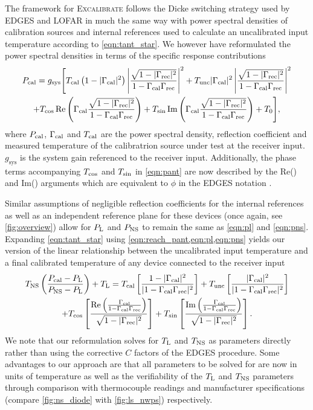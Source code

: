 The framework for \textsc{Excalibrate} follows the Dicke switching strategy used by EDGES \citep{edgesCal} and LOFAR \citep{lofarCal} in much the same way with power spectral densities of calibration sources and internal references used to calculate an uncalibrated input temperature according to \cref{eqn:tant_star}. We however have reformulated the power spectral densities in terms of the specific response contributions
\begin{multline}
    \label{eqn:reach_pant}
    P_{\mathrm{cal}} = g_{\mathrm{sys}} \Bigg[ T_{\mathrm{cal}}\left(1-|\Gamma_{\mathrm{cal}}|^2\right)\left|\frac{\sqrt{1 - |\Gamma_{\mathrm{rec}}|^2}}{1-\Gamma_{\mathrm{cal}}\Gamma_{\mathrm{rec}}}\right|^2 + T_{\mathrm{unc}}|\Gamma_{\mathrm{cal}}|^2\left|\frac{\sqrt{1 - |\Gamma_{\mathrm{rec}}|^2}}{1-\Gamma_{\mathrm{cal}}\Gamma_{\mathrm{rec}}}\right|^2 \\
    + T_{\mathrm{cos}}\operatorname{Re}\left(\Gamma_{\mathrm{cal}}\frac{\sqrt{1 - |\Gamma_{\mathrm{rec}}|^2}}{1-\Gamma_{\mathrm{cal}}\Gamma_{\mathrm{rec}}}\right) + T_{\mathrm{sin}}\operatorname{Im}\left(\Gamma_{\mathrm{cal}}\frac{\sqrt{1 - |\Gamma_{\mathrm{rec}}|^2}}{1-\Gamma_{\mathrm{cal}}\Gamma_{\mathrm{rec}}}\right) + T_0 \Bigg],
\end{multline}
where $P_{\mathrm{cal}}$, $\Gamma_{\mathrm{cal}}$ and $T_{\mathrm{cal}}$ are the power spectral density, reflection coefficient and measured temperature of the calibratrion source under test at the receiver input. $g_{\mathrm{sys}}$ is the system gain referenced to the receiver input. Additionally, the phase terms accompanying $T_{\mathrm{cos}}$ and $T_{\mathrm{sin}}$ in \cref{eqn:pant} are now described by the Re() and Im() arguments which are equivalent to $\phi$ in the EDGES notation \cite{rogersCal}.

Similar assumptions of negligible reflection coefficients for the internal references as well as an independent reference plane for these devices (once again, see \cref{fig:overview}) allow for $P_{\mathrm{L}}$ and $P_{\mathrm{NS}}$ to remain the same as \cref{eqn:pl} and \cref{eqn:pns}. Expanding \cref{eqn:tant_star} using \cref{eqn:reach_pant,eqn:pl,eqn:pns} yields our version of the linear relationship between the uncalibrated input temperature and a final calibrated temperature of any device connected to the receiver input
\begin{multline}
    \label{eqn:caleqn}
    T_{\mathrm{NS}}\left( \frac{P_{\mathrm{cal}} - P_{\mathrm{L}}}{P_{\mathrm{NS}} - P_{\mathrm{L}}} \right) + T_{\mathrm{L}} = T_{\mathrm{cal}}\left[ \frac{1-|\Gamma_{\mathrm{cal}}|^2}{|1-\Gamma_{\mathrm{cal}}\Gamma_{\mathrm{rec}}|^2} \right] + T_{\mathrm{unc}}\left[ \frac{|\Gamma_{\mathrm{cal}}|^2}{|1-\Gamma_{\mathrm{cal}}\Gamma_{\mathrm{rec}}|^2} \right] \\
    + T_{\mathrm{cos}}\left[ \frac{\operatorname{Re}\left(\frac{\Gamma_{\mathrm{cal}}}{1-\Gamma_{\mathrm{cal}}\Gamma_{\mathrm{rec}}}\right)}{\sqrt{1-|\Gamma_{\mathrm{rec}}|^2}} \right] + T_{\mathrm{sin}}\left[ \frac{\operatorname{Im}\left(\frac{\Gamma_{\mathrm{cal}}}{1-\Gamma_{\mathrm{cal}}\Gamma_{\mathrm{rec}}}\right)}{\sqrt{1-|\Gamma_{\mathrm{rec}}|^2}} \right].
\end{multline}
We note that our reformulation solves for $T_{\mathrm{L}}$ and $T_{\mathrm{NS}}$ as parameters directly rather than using the corrective $C$ factors of the EDGES procedure. Some advantages to our approach are that all parameters to be solved for are now in units of temperature as well as the verifiability of the $T_{\mathrm{L}}$ and $T_{\mathrm{NS}}$ parameters through comparison with thermocouple readings and manufacturer specifications (compare \cref{fig:ns_diode} with \cref{fig:ls_nwps}) respectively. 

